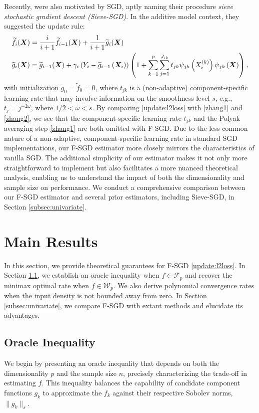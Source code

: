 Recently, \cite{zhang2022sieve} were also motivated by SGD, aptly naming their procedure \emph{sieve stochastic gradient descent (Sieve-SGD)}. In the additive model context, they suggested the update rule: 
\begin{align}
   &  \widetilde{f}_i(\bm{X}) = \frac{i}{i+1}\widetilde{f}_{i-1}(\bm{X}) + \frac{1}{i+1} \widetilde g_i(\bm{X}) \label{zhang1}\\
    & \widetilde g_i(\bm{X}) = \widetilde g_{i-1}(\bm{X}) + \gamma_i\left(Y_i - \widetilde g_{i-1}\left(\bm{X}_i\right)\right)\left(1+\sum_{k=1}^p\sum_{j=1}^{J_{ik}}t_{jk}\psi_{jk}\left(X_i^{(k)}\right)\psi_{jk}\left(\bm{X}\right)\right), \label{zhang2}
\end{align}
with initialization $\tilde g_0 = \tilde f_0 = 0$,  where $ t_{jk} $ is a (non-adaptive) component-specific learning rate that may involve information on the  smoothness level $ s $, e.g., $ t_{j} = j^{-2\omega} $, where $ 1/2 < \omega < s $.
By comparing \eqref{update:l2loss} with \eqref{zhang1} and \eqref{zhang2}, we see that the component-specific learning rate $ t_{jk} $ and the Polyak averaging step \eqref{zhang1} are both omitted with F-SGD. 
Due to the less common nature of a non-adaptive, component-specific learning rate in standard SGD implementations, our F-SGD estimator more closely mirrors the characteristics of vanilla SGD. The additional simplicity of our estimator makes it not only more straightforward to implement but also facilitates a more nuanced theoretical analysis, enabling us to understand the impact of both the dimensionality and sample size on performance. We conduct a comprehensive comparison between our F-SGD estimator and several prior estimators, including Sieve-SGD, in Section \ref{subsec:univariate}.



\section{Main Results}\label{sec:main}
In this section, we provide theoretical guarantees for F-SGD \eqref{update:l2loss}.
In Section \ref{subsec:additive}, we establish an oracle inequality when $f \in \mathcal{F}_p$ and recover the minimax optimal rate when $f \in \mathcal{W}_p$. We also derive polynomial convergence rates when the input density is not bounded away from zero. In Section \ref{subsec:univariate}, we compare F-SGD with extant methods and elucidate its advantages.


\subsection{Oracle Inequality}\label{subsec:additive}
We begin by presenting an oracle inequality that depends on both the dimensionality $p$ and the sample size $n$, precisely characterizing the trade-off in estimating $f$. This inequality balances the capability of candidate component functions $g_k$ to approximate the $f_k$ against their respective Sobolev norms, $\|g_k\|_s$. 

